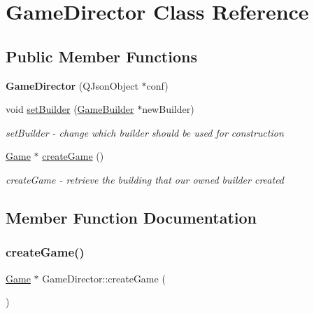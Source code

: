 \hypertarget{class_game_director}{}\section{Game\+Director Class Reference}
\label{class_game_director}
\subsection*{Public Member Functions}
\begin{DoxyCompactItemize}
\item 
\mbox{\label{class_game_director_a3ac974d917a3cff7a7873bcf9bbfc2ce}} 
{\bfseries Game\+Director} (Q\+Json\+Object $\ast$conf)
\item 
void \mbox{\hyperlink{class_game_director_af849b0b8309680e7eb53cc1803895aab}{set\+Builder}} (\mbox{\hyperlink{class_game_builder}{Game\+Builder}} $\ast$new\+Builder)
\begin{DoxyCompactList}\small\item\em set\+Builder -\/ change which builder should be used for construction \end{DoxyCompactList}\item 
\mbox{\hyperlink{class_game}{Game}} $\ast$ \mbox{\hyperlink{class_game_director_a39ad3747cf1b3bf8a6e335167f73d04b}{create\+Game}} ()
\begin{DoxyCompactList}\small\item\em create\+Game -\/ retrieve the building that our owned builder created \end{DoxyCompactList}\end{DoxyCompactItemize}


\subsection{Member Function Documentation}
\mbox{\label{class_game_director_a39ad3747cf1b3bf8a6e335167f73d04b}} 
\subsubsection{\texorpdfstring{create\+Game()}{createGame()}}
{\footnotesize\ttfamily \mbox{\hyperlink{class_game}{Game}} $\ast$ Game\+Director\+::create\+Game (\begin{DoxyParamCaption}{ }\end{DoxyParamCaption})}



